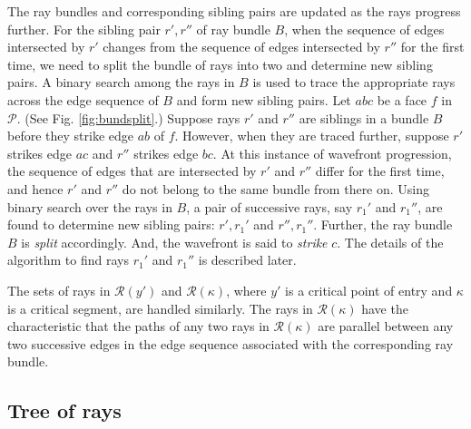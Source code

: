 \documentclass[11pt]{article}
\def\calP{\mathcal{P}}
\def\calR{\mathcal{R}}
\begin{document}
The ray bundles and corresponding sibling pairs are updated as the rays progress further.
For the sibling pair $r', r''$ of ray bundle $B$, when the sequence of edges intersected by $r'$ changes from the sequence of edges intersected by $r''$ for the first time, we need to split the bundle of rays into two and determine new sibling pairs.  
A binary search among the rays in $B$ is used to trace the appropriate rays across the edge sequence of $B$ and form new sibling pairs. 
Let $abc$ be a face $f$ in $\calP$.
(See Fig. \ref{fig:bundsplit}.)
Suppose rays $r'$ and $r''$ are siblings in a bundle $B$ before they strike edge $ab$ of $f$. 
However, when they are traced further, suppose $r'$ strikes edge $ac$ and $r''$ strikes edge $bc$.
At this instance of wavefront progression, the sequence of edges that are intersected by  $r'$ and $r''$ differ for the first time, and hence $r'$ and $r''$ do not belong to the same bundle from there on.
Using binary search over the rays in $B$, a pair of successive rays, say $r_1'$ and $r_1''$, are found to determine new sibling pairs: $r', r_1'$ and $r'', r_1''$.
Further, the ray bundle $B$ is {\it split} accordingly.
And, the wavefront is said to {\em strike} $c$. 
The details of the algorithm to find rays $r_1'$ and $r_1''$ is described later.

The sets of rays in $\calR(y')$ and $\calR(\kappa)$, where $y'$ is a critical point of entry and $\kappa$ is a critical segment, are handled similarly.
The rays in $\calR(\kappa)$ have the characteristic that the paths of any two rays in $\calR(\kappa)$ are parallel between any two successive edges in the edge sequence associated with the corresponding ray bundle.

\subsection{Tree of rays}
\end{document}

